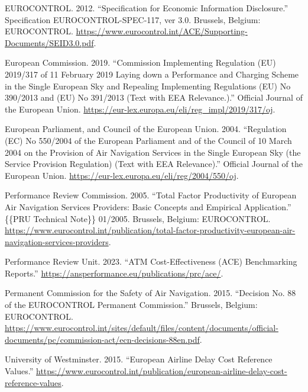 \documentclass[
  11pt,
  a4paperpaper,
  openany,headsepline=on,footsepline=off,DIV=12,table]{scrbook}
\newlength{\cslhangindent}
\newenvironment{CSLReferences}[2] %
 {\begin{list}{}{%
  \setlength{\itemindent}{0pt}
  \setlength{\leftmargin}{0pt}
  \setlength{\parsep}{0pt}
  \ifodd #1
   \setlength{\leftmargin}{\cslhangindent}
   \setlength{\itemindent}{-1\cslhangindent}
  \fi
  \setlength{\itemsep}{#2\baselineskip}}}
 {\end{list}}
\begin{document}
\label{refs}
\begin{CSLReferences}{1}{0}
EUROCONTROL. 2012. {``Specification for {Economic Information
Disclosure}.''} Specification EUROCONTROL-SPEC-117, ver 3.0. {Brussels,
Belgium}: {EUROCONTROL}.
\url{https://www.eurocontrol.int/ACE/Supporting-Documents/SEID3.0.pdf}.

European Commission. 2019. {``Commission {Implementing Regulation}
({EU}) 2019/317 of 11 {February} 2019 Laying down a Performance and
Charging Scheme in the Single {European} Sky and Repealing {Implementing
Regulations} ({EU}) {No} 390/2013 and ({EU}) {No} 391/2013 ({Text} with
{EEA} Relevance.).''} {Official Journal of the European Union}.
\url{https://eur-lex.europa.eu/eli/reg_impl/2019/317/oj}.

European Parliament, and Council of the European Union. 2004.
{``Regulation ({EC}) {No} 550/2004 of the {European Parliament} and of
the {Council} of 10 {March} 2004 on the Provision of Air Navigation
Services in the Single {European} Sky (the Service Provision
{Regulation}) ({Text} with {EEA} Relevance).''} {Official Journal of the
European Union}. \url{https://eur-lex.europa.eu/eli/reg/2004/550/oj}.

Performance Review Commission. 2005. {``Total {Factor Productivity} of
{European Air Navigation Services Providers}: {Basic Concepts} and
{Empirical Application}.''} \{\{PRU Technical Note\}\} 01/2005.
{Brussels, Belgium}: {EUROCONTROL}.
\url{https://www.eurocontrol.int/publication/total-factor-productivity-european-air-navigation-services-providers}.

Performance Review Unit. 2023. {``{ATM Cost-Effectiveness} ({ACE})
{Benchmarking Reports}.''}
\url{https://ansperformance.eu/publications/prc/ace/}.

Permanent Commission for the Safety of Air Navigation. 2015. {``Decision
{No}. 88 of the {EUROCONTROL Permanent Commission}.''} {Brussels,
Belgium}: {EUROCONTROL}.
\url{https://www.eurocontrol.int/sites/default/files/content/documents/official-documents/pc/commission-act/ecn-decisions-88en.pdf}.

University of Westminster. 2015. {``European Airline Delay Cost
Reference Values.''}
\url{https://www.eurocontrol.int/publication/european-airline-delay-cost-reference-values}.

\end{CSLReferences}
\end{document}
